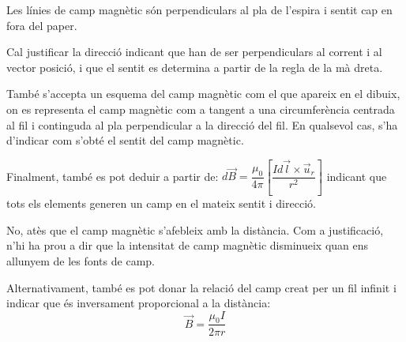 \begin{solapartat}
\begin{minipage}[t]{0.7\linewidth}

Les línies de camp magnètic són perpendiculars al pla de l'espira i sentit cap en fora del paper.

Cal justificar la direcció indicant que han de ser perpendiculars al corrent i al vector posició, i que el sentit es determina a partir de la regla de la mà dreta.
\end{minipage}\hfill
\begin{minipage}[t]{0.26\linewidth}
\vspace{0pt}
\end{minipage}

\smallskip
\begin{minipage}[t]{0.7\linewidth}
També s'accepta un esquema del camp magnètic com el que apareix en el dibuix, on es representa el camp magnètic com a tangent a una circumferència centrada al fil i continguda al pla perpendicular a la direcció del fil. En qualsevol cas, s'ha d'indicar com s'obté el sentit del camp magnètic.
\end{minipage}\hfill
\begin{minipage}[t]{0.26\linewidth}
\vspace{0pt}
\end{minipage}

\smallskip
Finalment, també es pot deduir a partir de: $d\vec{B} = \dfrac{\mu_0}{4\pi}\left[\dfrac{I d\vec{l}\times\vec{u}_r}{r^2}\right]$ indicant que tots els elements generen un camp en el mateix sentit i direcció.

\medskip
{} No, atès que el camp magnètic s'afebleix amb la distància. Com a justificació, n'hi ha prou a dir que la intensitat de camp magnètic disminueix quan ens allunyem de les fonts de camp.

Alternativament, també es pot donar la relació del camp creat per un fil infinit i indicar que és inversament proporcional a la distància:
\[ \vec{B} = \frac{\mu_0 I}{2\pi r} \]
\end{solapartat}

